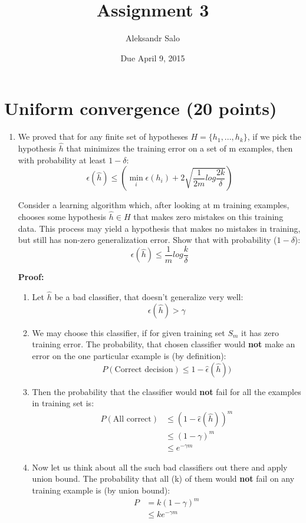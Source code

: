 \documentclass{article}
\title{Assignment 3}
\date{Due April 9, 2015}
\author{Aleksandr Salo}
\newcommand{\hhat}{\hat{h}}
\begin{document}
\maketitle

\section{Uniform convergence (20 points)}
	\begin{enumerate}
		\item  We proved that for any finite set of hypotheses $H = \{h_1,...,h_k\}$, if we pick the hypothesis $\hat{h}$	that minimizes the training error on a set of m examples, then with probability at least $1-\delta$:
		$$ \epsilon (\hat{h}) \le (\min_i \epsilon(h_i)+2 \sqrt{\frac{1}{2m} log \frac{2k}{\delta}})$$
		
		Consider a learning algorithm which, after looking at m training examples, chooses some hypothesis
		$\hat{h} \in H$ that makes zero mistakes on this training data. This process may yield a hypothesis that makes no mistakes in training, but still has non-zero generalization error. Show that with probability ($1-\delta$):
		$$\epsilon (\hat{h}) \le \frac{1}{m} log \frac{k}{\delta}$$
		
		\textbf{Proof:}
		\begin{enumerate}
			\item Let $\hat{h}$ be a bad classifier, that doesn't generalize very well: 
			$$\epsilon(\hhat) > \gamma$$
			\item We may choose this classifier, if for given training set $S_m$ it has zero training error. The probability, that chosen classifier would \textbf{not} make an error on the one particular example is (by definition):
			$$P(\text{Correct decision}) \le 1 - \hat{\epsilon}(\hhat))$$			
			\item Then the probability that the classifier would \textbf{not} fail for all the examples in training set is:
			\begin{align*}
			P(\text{All correct}) &\le (1 - \hat{\epsilon}(\hhat))^m \\
			&\le  (1 - \gamma)^m \\
			& \le e^{-\gamma m} 
			\end{align*}
			
			\item Now let us think about all the such bad classifiers out there and apply union bound. The probability that all (k) of them would \textbf{not} fail on any training example is (by union bound):
			\begin{align*}
			P &= k(1 - \gamma)^m\\
			&\le ke^{-\gamma m}			
			\end{align*}
						

\end{enumerate}
\end{enumerate}
\end{document}
